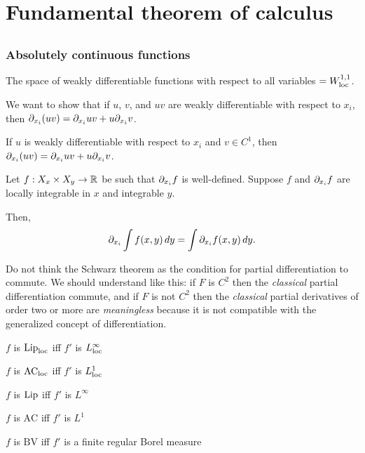 \documentclass{../../large}
\begin{document}
\part{Fundamental theorem of calculus}

\chapter{}

\section{Absolutely continuous functions}

The space of weakly differentiable functions with respect to all variables $=W_{\mathrm{loc}}^{1,1}$.

\begin{prb}
We want to show that if $u$, $v$, and $uv$ are weakly differentiable with respect to $x_i$, then $\pd_{x_i}(uv)=\pd_{x_i}uv+u\pd_{x_i}v$.
\begin{parts}
\item If $u$ is weakly differentiable with respect to $x_i$ and $v\in C^1$, then $\pd_{x_i}(uv)=\pd_{x_i}uv+u\pd_{x_i}v$.
\end{parts}
\end{prb}


\begin{prb}
Let $f:X_x\times X_y\to\mathbb{R}$ be such that $\pd_{x_i}f$ is well-defined. Suppose $f$ and $\pd_{x_i}f$ are locally integrable in $x$ and integrable $y$.

Then,
\[\pd_{x_i}\int f(x,y)\,dy=\int\pd_{x_i}f(x,y)\,dy.\]
\end{prb}


Do not think the Schwarz theorem as the condition for partial differentiation to commute.
We should understand like this: if $F$ is $C^2$ then the \emph{classical} partial differentiation commute, and if $F$ is not $C^2$ then the \emph{classical} partial derivatives of order two or more are \emph{meaningless} because it is not compatible with the generalized concept of differentiation.




\begin{parts}
\item $f$ is $\operatorname{Lip}_{\mathrm{loc}}$ iff $f'$ is $L_{\mathrm{loc}}^\infty$
\item $f$ is $\textrm{AC}_{\mathrm{loc}}$ iff $f'$ is $L_{\mathrm{loc}}^1$
\end{parts}
\begin{parts}
\item $f$ is $\operatorname{Lip}$ iff $f'$ is $L^\infty$
\item $f$ is $\textrm{AC}$ iff $f'$ is $L^1$
\item $f$ is $\textrm{BV}$ iff $f'$ is a finite regular Borel measure
\end{parts}
\end{document}
